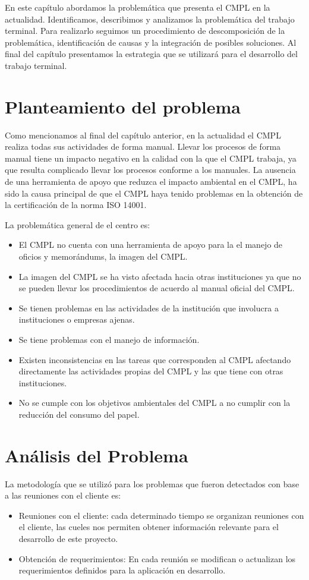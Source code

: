 En este capítulo abordamos la problemática que presenta el CMPL en la actualidad. Identificamos, describimos y analizamos la problemática del trabajo terminal. Para realizarlo seguimos un procedimiento de descomposición de la problemática, identificación de causas y la integración de posibles soluciones. Al final del capítulo presentamos la estrategia que se utilizará para el desarrollo del trabajo terminal. 
\section{Planteamiento del problema}
Como mencionamos al final del capítulo anterior, en la actualidad el CMPL realiza todas sus actividades de forma manual. Llevar los procesos de forma manual tiene un impacto negativo en la calidad con la que el CMPL trabaja, ya que resulta complicado llevar los procesos conforme a los manuales. La ausencia de una herramienta de apoyo que reduzca el impacto ambiental en el CMPL, ha sido la causa principal de que el CMPL haya tenido problemas en la obtención de la certificación de la norma ISO 14001. 

La problemática general de el centro es:
\begin{itemize}
	\item El CMPL no cuenta con una herramienta de apoyo para la el manejo de oficios y memorándums, la imagen del CMPL.
	\item La imagen del CMPL se ha visto afectada hacia otras instituciones ya que no se pueden llevar los procedimientos de acuerdo al manual oficial del CMPL.
	\item Se tienen problemas en las actividades de la institución que involucra a instituciones o empresas ajenas.
	\item Se tiene problemas con el manejo de información.
	\item Existen inconsistencias en las tareas que corresponden al CMPL afectando directamente las actividades propias del CMPL y las que tiene con otras instituciones.
	\item No se cumple con los objetivos ambientales del CMPL a no cumplir con la reducción del consumo del papel.
\end{itemize}

\section{Análisis del Problema}
La metodología que se utilizó para los problemas que fueron detectados con base a las reuniones con el cliente es:
	\begin{itemize}
		\item Reuniones con el cliente: cada determinado tiempo se organizan reuniones con el cliente, las cueles nos permiten obtener información relevante para el desarrollo de este proyecto.
		\item Obtención de requerimientos: En cada reunión se modifican o actualizan los requerimientos definidos para la aplicación en desarrollo.
	\end{itemize}

